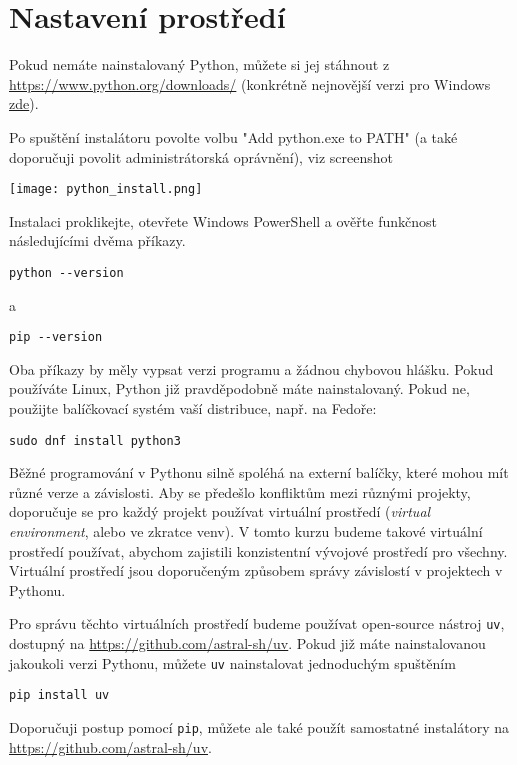 \newpage
\section{Nastavení prostředí}

Pokud nemáte nainstalovaný Python, můžete si jej stáhnout z \url{https://www.python.org/downloads/} (konkrétně nejnovější
verzi pro Windows \href{https://www.python.org/ftp/python/3.13.7/python-3.13.7-amd64.exe}{zde}).

Po spuštění instalátoru povolte volbu "Add python.exe to PATH" (a také doporučuji povolit administrátorská oprávnění), viz screenshot
\begin{center}
    \texttt{[image: python\_install.png]}
\end{center}

Instalaci proklikejte, otevřete Windows PowerShell a ověřte funkčnost následujícími dvěma příkazy.

\begin{verbatim}
python --version
\end{verbatim}
a
\begin{verbatim}
pip --version
\end{verbatim}

Oba příkazy by měly vypsat verzi programu a žádnou chybovou hlášku. Pokud používáte Linux, Python již pravděpodobně máte nainstalovaný. Pokud ne, použijte balíčkovací systém vaší distribuce, např. na Fedoře:
\begin{verbatim}
sudo dnf install python3
\end{verbatim}

Běžné programování v Pythonu silně spoléhá na externí balíčky, které mohou mít různé verze a závislosti. Aby se předešlo konfliktům mezi různými projekty, doporučuje se pro každý projekt používat virtuální prostředí (\emph{virtual environment}, alebo ve zkratce venv). V tomto kurzu budeme takové virtuální prostředí používat, abychom zajistili konzistentní vývojové prostředí pro všechny. Virtuální prostředí jsou doporučeným způsobem správy závislostí v projektech v Pythonu.

Pro správu těchto virtuálních prostředí budeme používat open-source nástroj \verb|uv|, dostupný na \url{https://github.com/astral-sh/uv}. Pokud již máte nainstalovanou jakoukoli verzi Pythonu, můžete \verb|uv| nainstalovat jednoduchým spuštěním
\begin{lstlisting}
pip install uv
\end{lstlisting}
Doporučuji postup pomocí \verb|pip|, můžete ale také použít samostatné instalátory na \url{https://github.com/astral-sh/uv}.

